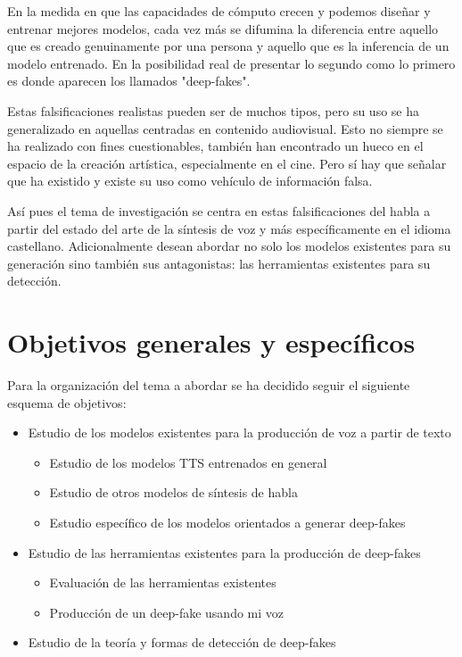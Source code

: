 En la medida en que las capacidades de cómputo crecen y podemos diseñar y entrenar mejores modelos, cada vez más se difumina la diferencia entre aquello que es creado genuinamente por una persona y aquello que es la inferencia de un modelo entrenado. En la posibilidad real de presentar lo segundo como lo primero es donde aparecen los llamados "deep-fakes".

Estas falsificaciones realistas pueden ser de muchos tipos, pero su uso se ha generalizado en aquellas centradas en contenido audiovisual. Esto no siempre se ha realizado con fines cuestionables, también han encontrado un hueco en el espacio de la creación artística, especialmente en el cine. Pero sí hay que señalar que ha existido y existe su uso como vehículo de información falsa.

Así pues el tema de investigación se centra en estas falsificaciones del habla a partir del estado del arte de la síntesis de voz y más específicamente en el idioma castellano. Adicionalmente desean abordar no solo los modelos existentes para su generación sino también sus antagonistas: las herramientas existentes para su detección.

\section{Objetivos generales y específicos}

Para la organización del tema a abordar se ha decidido seguir el siguiente esquema de objetivos:

\begin{itemize}

\item Estudio de los modelos existentes para la producción de voz a partir de texto

    \begin{itemize}
    \item Estudio de los modelos TTS entrenados en general
    \item Estudio de otros modelos de síntesis de habla
    \item Estudio específico de los modelos orientados a generar deep-fakes
    \end{itemize}
\item Estudio de las herramientas existentes para la producción de deep-fakes
    \begin{itemize}
         \item Evaluación de las herramientas existentes
         \item Producción de un deep-fake usando mi voz
    \end{itemize}
\item Estudio de la teoría y formas de detección de deep-fakes
\end{itemize}

